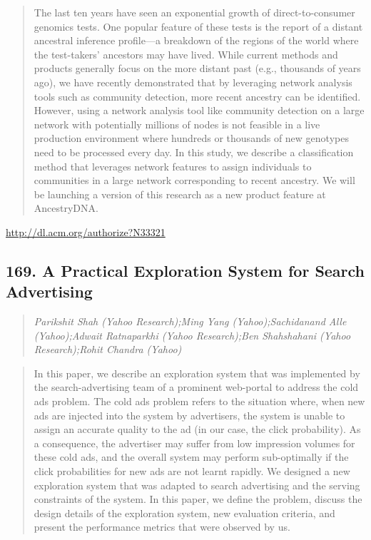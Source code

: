 \documentclass{article}
\begin{document}
\begin{quote}
The last ten years have seen an exponential growth of direct-to-consumer genomics tests. One popular feature of these tests is the report of a distant ancestral inference profile—a breakdown of the regions of the world where the test-takers’ ancestors may have lived. While current methods and products generally focus on the more distant past (e.g., thousands of years ago), we have recently demonstrated that by leveraging network analysis tools such as community detection, more recent ancestry can be identified. However, using a network analysis tool like community detection on a large network with potentially millions of nodes is not feasible in a live production environment where hundreds or thousands of new genotypes need to be processed every day. In this study, we describe a classification method that leverages network features to assign individuals to communities in a large network corresponding to recent ancestry. We will be launching a version of this research as a new product feature at AncestryDNA.
\end{quote}

\href{http://dl.acm.org/authorize?N33321}{http://dl.acm.org/authorize?N33321}

\subsection{169. A Practical Exploration System for Search Advertising}

\begin{quote}
\footnotesize{\textit{Parikshit Shah (Yahoo Research);Ming Yang (Yahoo);Sachidanand Alle (Yahoo);Adwait Ratnaparkhi (Yahoo Research);Ben Shahshahani (Yahoo Research);Rohit Chandra (Yahoo)}}

\end{quote}

\begin{quote}
In this paper, we describe an exploration system that was implemented by the search-advertising team of a prominent web-portal to address the cold ads problem. The cold ads problem refers to the situation where, when new ads are injected into the system by advertisers, the system is unable to assign an accurate quality to the ad (in our case, the click probability). As a consequence, the advertiser may suffer from low impression volumes for these cold ads, and the overall system may perform sub-optimally if the click probabilities for new ads are not learnt rapidly. We designed a new exploration system that was adapted to search advertising and the serving constraints of the system. In this paper, we define the problem, discuss the design details of the exploration system, new evaluation criteria, and present the performance metrics that were observed by us.
\end{quote}
\end{document}
